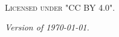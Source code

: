 \newpage
\begin{fullwidth}
~\vfill
\thispagestyle{empty}
\setlength{\parindent}{0pt}
\setlength{\parskip}{\baselineskip}

\par\textsc{Licensed under "CC BY 4.0".}
\par\textit{Version of \today.}
\end{fullwidth}
